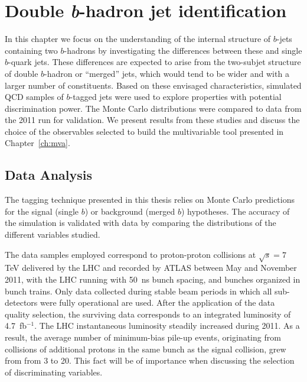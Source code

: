 \chapter{Double \emph{\textbf{b}}-hadron jet identification}\label{ch:kinematic}

In this chapter we focus on the understanding of the internal structure of $b$-jets containing two $b$-hadrons by investigating the differences between these and single $b$-quark jets.  These differences %
are expected to arise from the two-subjet structure of double $b$-hadron or ``merged'' jets, which would tend to be wider and with a larger number of constituents. 
Based on these envisaged characteristics, simulated QCD samples of $b$-tagged jets were used to explore properties with potential discrimination power.  The Monte Carlo distributions were  compared to data from the 2011 run for validation.
We present results from these studies and discuss the choice of the observables selected to build the multivariable tool presented in Chapter~\ref{ch:mva}.


\section{Data Analysis}\label{sec:analysis}


The tagging technique presented in this thesis relies on Monte Carlo predictions for the signal (single $b$) or background (merged $b$) hypotheses. The accuracy of the simulation is validated with data by comparing the distributions of the different variables studied.

The data samples employed correspond to proton-proton collisions at $\sqrt{s}=7$ TeV delivered by the LHC and recorded by ATLAS between May and November 2011, with the LHC running with 50~ns bunch spacing, and bunches organized in bunch trains. Only data collected during stable beam periods in which all sub-detectors were fully operational are used. After the application of the data quality selection, the  surviving data corresponds to an integrated luminosity of 4.7~fb$^{-1}$. The LHC instantaneous luminosity steadily increased during 2011. As a result, the average number of minimum-bias pile-up events, originating from collisions of additional protons in the same bunch as the signal collision, grew from from 3 to 20. This fact will be of importance when discussing the selection of discriminating variables.  

